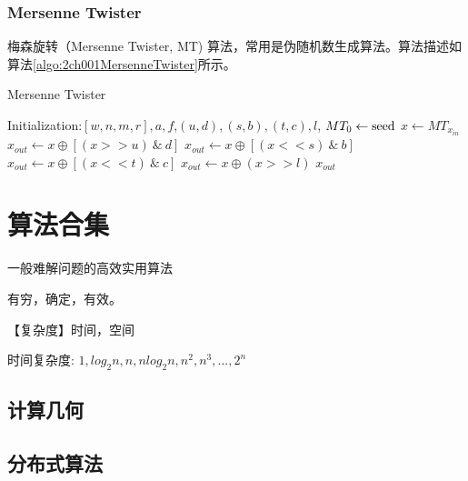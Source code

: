 \documentclass[UTF8]{../computerUniverse}
\begin{document}
\subsection{Mersenne Twister}
梅森旋转（Mersenne Twister, MT) 算法，常用是伪随机数生成算法。算法描述如算法\ref{algo:2ch001MersenneTwister}所示。

      \begin{algorithm}[ht]
        \caption{Mersenne Twister}\label{algo:2ch001MersenneTwister}
        \SetAlgoLined
        Initialization:$[w, n, m, r], a, f$,$(u,d),(s,b),(t,c),l$, $MT_0 \leftarrow {\rm seed}$\;
        $x \leftarrow MT_{x_{in}}$\;
        $x_{out} \leftarrow x \oplus [ (x >> u) \ \& \  d]$\;
        $x_{out} \leftarrow x \oplus [ (x << s) \ \& \ b]$\;
        $x_{out} \leftarrow x \oplus [ (x << t) \ \& \  c]$\;
        $x_{out} \leftarrow x \oplus  (x >> l) $\;
        \KwRet $x_{out}$\;
      \end{algorithm}






\chapter{算法合集}
一般难解问题的高效实用算法

有穷，确定，有效。

【复杂度】时间，空间

时间复杂度: $1,log_2n,n,nlog_2n,n^2,n^3,...,2^n$




\section{计算几何}

\section{分布式算法}
\end{document}
